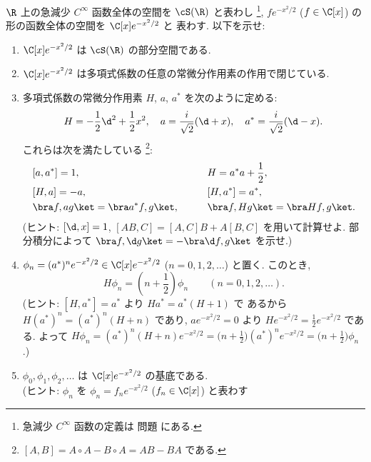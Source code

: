 \documentclass[12pt,twoside]{jarticle}
\begin{document}
\begin{question}[量子調和振動子, 15点]
\label{q:quantum-harmonic-oscillator}
  $\R$ 上の急減少 $C^\infty$ 函数全体の空間を $\cS(\R)$ と表わし%
  \footnote{急減少 $C^\infty$ 函数の定義は
    問題  にある.},
  $f e^{-x^2/2}$ ($f\in\C[x]$) の形の函数全体の空間を $\C[x]e^{-x^2/2}$ と
  表わす.  以下を示せ:
  \begin{enumerate}
  \item $\C[x]e^{-x^2/2}$ は $\cS(\R)$ の部分空間である.
  \item $\C[x]e^{-x^2/2}$ は多項式係数の任意の常微分作用素の作用で閉じている.
  \item 多項式係数の常微分作用素 $H$, $a$, $a^*$ を次のように定める:
    \begin{equation*}
      H = - \frac{1}{2}\d^2 + \frac{1}{2}x^2,
      \quad
      a = \frac{i}{\sqrt{2}}(\d + x),
      \quad
      a^* = \frac{i}{\sqrt{2}}(\d - x).
    \end{equation*}
    これらは次を満たしている%
    \footnote{$[A,B] = A\circ A - B\circ A = AB-BA$ である.}:
    \begin{alignat*}{2}
      &
      [a,a^*] = 1, 
      \qquad & &
      H = a^*a + \frac{1}{2},
      \\ &
      [H,a] = - a,
      \qquad & &
      [H,a^*] = a^*,
      \\ &
      \bra f,ag\ket = \bra a^*f,g\ket,
      \qquad & &
      \bra f,Hg\ket = \bra Hf,g\ket.
    \end{alignat*}
    (ヒント: $[\d,x]=1$, $[AB,C]=[A,C]B+A[B,C]$ を用いて計算せよ.
    部分積分によって $\bra f,\d g\ket = -\bra\d f,g\ket$ を示せ.)
  \item $\phi_n = (a^*)^n e^{-x^2/2}\in\C[x]e^{-x^2/2}$ 
    ($n=0,1,2,\ldots$) と置く.  このとき,
    \begin{equation*}
      H \phi_n = \left(n + \frac{1}{2}\right) \phi_n
      \qquad
      (n=0,1,2,\ldots).
    \end{equation*}
    (ヒント: $[H,a^*]=a^*$ より $Ha^*=a^*(H+1)$ で
    あるから $H(a^*)^n = (a^*)^n(H+n)$ であり, 
    $a e^{-x^2/2} = 0$ より $H e^{-x^2/2} = \frac{1}{2} e^{-x^2/2}$ 
    である.  よって $H\phi_n = (a^*)^n(H+n)e^{-x^2/2}
    =\bigl(n+\frac{1}{2}\bigr)(a^*)^ne^{-x^2/2}
    =\bigl(n+\frac{1}{2}\bigr)\phi_n$.)
  \item $\phi_0,\phi_1,\phi_2,\ldots$ は $\C[x]e^{-x^2/2}$ の基底である.
    \\(ヒント: $\phi_n$ を $\phi_n=f_n e^{-x^2/2}$ ($f_n\in\C[x]$) と表わす

\end{enumerate}
\end{question}
\end{document}
